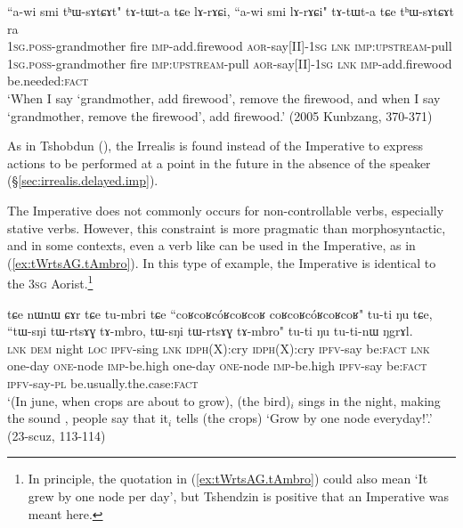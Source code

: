 \begin{exe}
\ex \label{ex:thWsAtCAt.lArACi}
\gll ``a-wi smi tʰɯ-sɤtɕɤt" tɤ-tɯt-a tɕe lɤ-rɤɕi, ``a-wi smi lɤ-rɤɕi" tɤ-tɯt-a tɕe tʰɯ-sɤtɕɤt ra \\
\textsc{1sg}.\textsc{poss}-grandmother fire \textsc{imp}-add.firewood \textsc{aor}-say[II]-\textsc{1sg} \textsc{lnk} \textsc{imp}:\textsc{upstream}-pull \textsc{1sg}.\textsc{poss}-grandmother fire \textsc{imp}:\textsc{upstream}-pull  \textsc{aor}-say[II]-\textsc{1sg} \textsc{lnk} \textsc{imp}-add.firewood be.needed:\textsc{fact} \\
\glt `When I say `grandmother, add firewood', remove the firewood, and when I say `grandmother, remove the firewood', add firewood.' (2005 Kunbzang, 370-371) 
\end{exe}

As in Tshobdun (\citealt[809]{jackson07irrealis}), the Irrealis is found instead of the Imperative to express actions to be performed at a point in the future in the absence of the speaker (§\ref{sec:irrealis.delayed.imp}). 

The Imperative does not commonly occurs for non-controllable verbs, especially stative verbs. However, this constraint is more pragmatic than morphosyntactic, and in some contexts, even a verb like  can be used in the Imperative, as in (\ref{ex:tWrtsAG.tAmbro}). In this type of example, the Imperative  is identical to the \textsc{3sg} Aorist.\footnote{In principle, the quotation in (\ref{ex:tWrtsAG.tAmbro}) could also mean `It grew by one node per day', but Tshendzin is positive that an Imperative was meant here. }

\begin{exe}
\ex \label{ex:tWrtsAG.tAmbro}
\gll tɕe nɯnɯ ɕɤr tɕe tu-mbri tɕe ``coʁcoʁcóʁcoʁcoʁ coʁcoʁcóʁcoʁcoʁ" tu-ti ŋu tɕe, ``tɯ-sŋi tɯ-rtsɤɣ tɤ-mbro, tɯ-sŋi tɯ-rtsɤɣ tɤ-mbro" tu-ti ŋu tu-ti-nɯ ŋgrɤl. \\
\textsc{lnk} \textsc{dem} night \textsc{loc} \textsc{ipfv}-sing \textsc{lnk} \textsc{idph}(X):cry  \textsc{idph}(X):cry \textsc{ipfv}-say be:\textsc{fact} \textsc{lnk} one-day \textsc{one}-node \textsc{imp}-be.high one-day \textsc{one}-node \textsc{imp}-be.high \textsc{ipfv}-say be:\textsc{fact} \textsc{ipfv}-say-\textsc{pl} be.usually.the.case:\textsc{fact}  \\
\glt `(In june, when crops are about to grow), (the  bird)$_i$ sings in the night, making the sound , people say that it$_i$  tells (the crops) `Grow by one node everyday!'.' (23-scuz, 113-114)
\end{exe}

